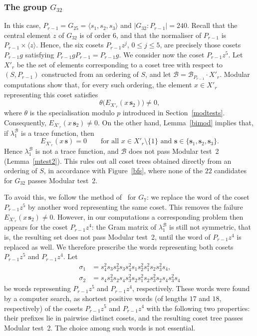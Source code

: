 \documentclass[11pt, reqno]{amsart}
\newcommand{\cB}{\mathcal{B}}
\numberwithin{equation}{section}
\theoremstyle{remark}
\begin{document}
\subsubsection{The group $G_{32}$}\label{g32}
In this case, $P_{r-1}=G_{25}=\langle s_1,s_2,s_3\rangle$ and $|G_{32}:P_{r-1}|=240$. Recall that the central element $z$ of $G_{32}$ is of order $6$, and that the normaliser of $P_{r-1}$ is $P_{r-1}\times\langle z\rangle$. Hence, the six cosets $P_{r-1}z^j$, $0\le j\le5$, are precisely those cosets $P_{r-1}g$ satisfying $P_{r-1}gP_{r-1}=P_{r-1}g$. We consider now the coset $P_{r-1}z^5$. Let $X'_r$ be the set of elements corresponding to a coset tree with respect to $(S,P_{r-1})$ constructed from an ordering of $S$, and let $\cB=\cB_{P_{r-1}}\cdot X'_r$. Modular computations show that, for every such ordering, the element $x\in X'_r$ representing this coset satisfies
\[
\theta\bigl(E_{X'_r}(x\,\mathbf s_2)\bigr)\neq0,
\]
where $\theta$ is the specialisation modulo $p$ introduced in Section~\ref{modtests}. Consequently, $E_{X'_r}(x\,\mathbf s_2)\neq0$. On the other hand, Lemma~\ref{bimod} implies that, if $\lambda_1^{\cB}$ is a trace function, then
\[
E_{X'_r}(x\,\mathbf s)=0
\qquad
\text{for all }x\in X'_r\setminus\{1\}
\text{ and }\mathbf s\in\{\mathbf s_1,\mathbf s_2,\mathbf s_3\}.
\]
Hence $\lambda_1^{\cB}$ is not a trace function, and $\cB$ does not pass Modular test~2 (Lemma~\ref{mtest2}). This rules out all coset trees obtained directly from an ordering of $S$, in accordance with Figure~\ref{bfs}, where none of the $22$ candidates for $G_{32}$ passes Modular test~2.

To avoid this, we follow the method of~\cite[\S4.2.4]{BCCK} for $G_7$: we replace the word of the coset $P_{r-1}z^5$ by another word representing the same coset. This removes the failure $E_{X'_r}(x\,\mathbf s_2)\neq0$. However, in our computations a corresponding problem then appears for the coset $P_{r-1}z^4$: the Gram matrix of $\lambda_1^{\cB}$ is still not symmetric, that is, the resulting set does not pass Modular test~2, until the word of $P_{r-1}z^4$ is replaced as well.  We therefore prescribe the words representing both cosets $P_{r-1}z^5$ and $P_{r-1}z^4$. Let
\begin{align*}
	\sigma_1&=s_4^2s_3s_2^2s_3s_4^2s_1s_2^2s_1^2s_2s_3^2s_4,\\
	\sigma_2&=s_4s_3^2s_2s_4s_3^2s_2s_1^2s_2s_3^2s_2s_4s_3^2s_4
\end{align*}
be words representing $P_{r-1}z^5$ and $P_{r-1}z^4$, respectively. These words were found by a computer search, as shortest positive words (of lengths $17$ and $18$, respectively) of the cosets $P_{r-1}z^5$ and $P_{r-1}z^4$ with the following two properties: their prefixes lie in pairwise distinct cosets, and the resulting coset tree passes Modular test~2. The choice among such words is not essential.
\end{document}
